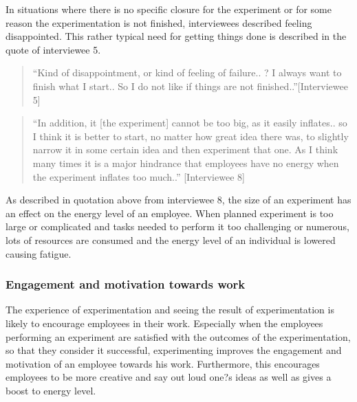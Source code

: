 In situations where there is no specific closure for the experiment or for some reason the experimentation is not finished, interviewees described feeling disappointed. This rather typical need for getting things done is described in the quote of interviewee 5.
 \begin{quote}
``Kind of disappointment, or kind of feeling of failure.. ? I always want to finish what I start.. So I do not like if things are not finished..''[Interviewee 5]
\end{quote}
\begin{quote}
``In addition, it [the experiment] cannot be too big, as it easily inflates.. so I think it is better to start, no matter how great idea there was, to slightly narrow it in some certain idea and then experiment that one. As I think many times it is a major hindrance that employees have no energy when the experiment inflates too much..'' [Interviewee 8]
\end{quote}
As described in quotation above from interviewee 8, the size of an experiment has an effect on the energy level of an employee. When planned experiment is too large or complicated and tasks needed to perform it too challenging or numerous, lots of resources are consumed and the energy level of an individual is lowered causing fatigue. 

\subsubsection{Engagement and motivation towards work}
The experience of experimentation and seeing the result of experimentation is likely to encourage employees in their work.  Especially when the employees performing an experiment are satisfied with the outcomes of the experimentation, so that they consider it successful, experimenting improves the engagement and motivation of an employee towards his work. Furthermore, this encourages employees to be more creative and say out loud one?s ideas as well as gives a boost to energy level.

